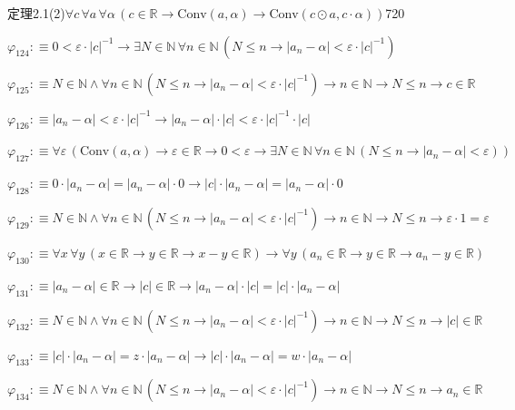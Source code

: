 \begin{fullproof}{定理2.1(2)}{$\forall c\,\forall a\,\forall \alpha\,(c \in \mathbb{R} \to \mathrm{Conv}(a,\alpha) \to \mathrm{Conv}(c \odot a,c \cdot \alpha))$}{720}
\begin{abbrevlist}
\item $\varphi_{124} :\equiv 0 < \varepsilon \cdot \lvert c \rvert^{-1} \to \exists N \in \mathbb{N}\,\forall n \in \mathbb{N}\,(N \leq n \to \lvert a_{n} - \alpha \rvert < \varepsilon \cdot \lvert c \rvert^{-1})$
\item $\varphi_{125} :\equiv N \in \mathbb{N} \land \forall n \in \mathbb{N}\,(N \leq n \to \lvert a_{n} - \alpha \rvert < \varepsilon \cdot \lvert c \rvert^{-1}) \to n \in \mathbb{N} \to N \leq n \to c \in \mathbb{R}$
\item $\varphi_{126} :\equiv \lvert a_{n} - \alpha \rvert < \varepsilon \cdot \lvert c \rvert^{-1} \to \lvert a_{n} - \alpha \rvert \cdot \lvert c \rvert < \varepsilon \cdot \lvert c \rvert^{-1} \cdot \lvert c \rvert$
\item $\varphi_{127} :\equiv \forall \varepsilon\,(\mathrm{Conv}(a,\alpha) \to \varepsilon \in \mathbb{R} \to 0 < \varepsilon \to \exists N \in \mathbb{N}\,\forall n \in \mathbb{N}\,(N \leq n \to \lvert a_{n} - \alpha \rvert < \varepsilon))$
\item $\varphi_{128} :\equiv 0 \cdot \lvert a_{n} - \alpha \rvert = \lvert a_{n} - \alpha \rvert \cdot 0 \to \lvert c \rvert \cdot \lvert a_{n} - \alpha \rvert = \lvert a_{n} - \alpha \rvert \cdot 0$
\item $\varphi_{129} :\equiv N \in \mathbb{N} \land \forall n \in \mathbb{N}\,(N \leq n \to \lvert a_{n} - \alpha \rvert < \varepsilon \cdot \lvert c \rvert^{-1}) \to n \in \mathbb{N} \to N \leq n \to \varepsilon \cdot 1 = \varepsilon$
\item $\varphi_{130} :\equiv \forall x\,\forall y\,(x \in \mathbb{R} \to y \in \mathbb{R} \to x - y \in \mathbb{R}) \to \forall y\,(a_{n} \in \mathbb{R} \to y \in \mathbb{R} \to a_{n} - y \in \mathbb{R})$
\item $\varphi_{131} :\equiv \lvert a_{n} - \alpha \rvert \in \mathbb{R} \to \lvert c \rvert \in \mathbb{R} \to \lvert a_{n} - \alpha \rvert \cdot \lvert c \rvert = \lvert c \rvert \cdot \lvert a_{n} - \alpha \rvert$
\item $\varphi_{132} :\equiv N \in \mathbb{N} \land \forall n \in \mathbb{N}\,(N \leq n \to \lvert a_{n} - \alpha \rvert < \varepsilon \cdot \lvert c \rvert^{-1}) \to n \in \mathbb{N} \to N \leq n \to \lvert c \rvert \in \mathbb{R}$
\item $\varphi_{133} :\equiv \lvert c \rvert \cdot \lvert a_{n} - \alpha \rvert = z \cdot \lvert a_{n} - \alpha \rvert \to \lvert c \rvert \cdot \lvert a_{n} - \alpha \rvert = w \cdot \lvert a_{n} - \alpha \rvert$
\item $\varphi_{134} :\equiv N \in \mathbb{N} \land \forall n \in \mathbb{N}\,(N \leq n \to \lvert a_{n} - \alpha \rvert < \varepsilon \cdot \lvert c \rvert^{-1}) \to n \in \mathbb{N} \to N \leq n \to a_{n} \in \mathbb{R}$

\end{abbrevlist}
\end{fullproof}
